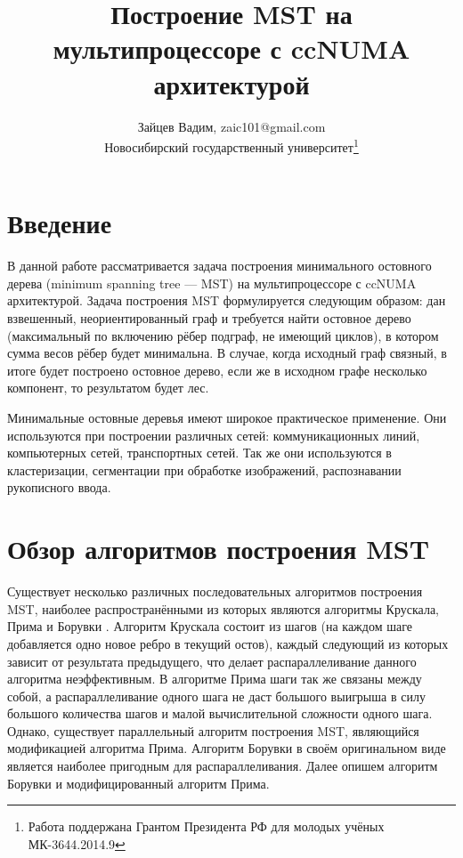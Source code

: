 \documentclass{article}
\date{}
\title{Построение MST на мультипроцессоре с ccNUMA архитектурой}
\author{Зайцев Вадим, zaic101@gmail.com \\ Новосибирский государственный университет\thanks{Работа поддержана Грантом Президента РФ для молодых учёных МК-3644.2014.9}}
\begin{document}

\tableofcontents



\newpage
\section{Введение}

В данной работе рассматривается задача построения минимального остовного дерева (minimum spanning tree --- MST) на мультипроцессоре с ccNUMA архитектурой.
Задача построения MST формулируется следующим образом: дан взвешенный, неориентированный граф и требуется найти остовное дерево (максимальный по включению рёбер подграф, не имеющий циклов), в котором сумма весов рёбер будет минимальна.
В случае, когда исходный граф связный, в итоге будет построено остовное дерево, если же в исходном графе несколько компонент, то результатом будет лес.

Минимальные остовные деревья имеют широкое практическое применение.
Они используются при построении различных сетей: коммуникационных линий, компьютерных сетей, транспортных сетей.
Так же они используются в кластеризации, сегментации при обработке изображений, распознавании рукописного ввода.


\newpage
\section{Обзор алгоритмов построения MST}
Существует несколько различных последовательных алгоритмов построения MST, наиболее распространёнными из которых являются алгоритмы Крускала, Прима и Борувки \cite{cormen}.
Алгоритм Крускала состоит из шагов (на каждом шаге добавляется одно новое ребро в текущий остов), каждый следующий из которых зависит от результата предыдущего, что делает распараллеливание данного алгоритма неэффективным.
В алгоритме Прима шаги так же связаны между собой, а распараллеливание одного шага не даст большого выигрыша в силу большого количества шагов и малой вычислительной сложности одного шага.
Однако, существует параллельный алгоритм построения MST, являющийся модификацией алгоритма Прима.
Алгоритм Борувки в своём оригинальном виде является наиболее пригодным для распараллеливания. 
Далее опишем алгоритм Борувки и модифицированный алгоритм Прима.
\end{document}

